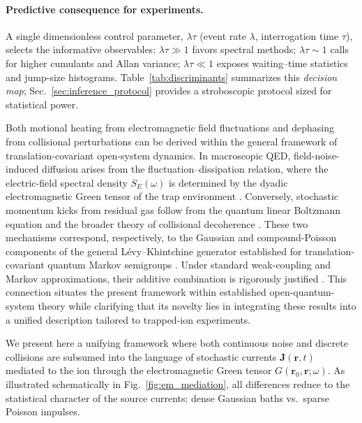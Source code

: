\paragraph{Predictive consequence for experiments.}
A single dimensionless control parameter, $\lambda\tau$ (event rate $\lambda$,
interrogation time $\tau$), selects the informative observables:
$\lambda\tau\gg1$ favors spectral methods; $\lambda\tau\sim1$ calls for higher
cumulants and Allan variance; $\lambda\tau\ll1$ exposes waiting--time statistics
and jump-size histograms. Table~\ref{tab:discriminants} summarizes this
\emph{decision map}; Sec.~\ref{sec:inference_protocol} provides a stroboscopic
protocol sized for statistical power.

Both motional heating from electromagnetic field fluctuations and
dephasing from collisional perturbations can be derived within the general
framework of translation-covariant open-system dynamics.
In macroscopic QED, field-noise-induced diffusion arises from the
fluctuation--dissipation relation, where the electric-field spectral
density $S_E(\omega)$ is determined by the dyadic electromagnetic Green
tensor of the trap environment
\cite{ScheelBuhmann2008,BrownnuttRMP2015,BuhmannDispersionForcesII}.
Conversely, stochastic momentum kicks from residual gas follow from the
quantum linear Boltzmann equation and the broader theory of collisional
decoherence
\cite{HornbergerSipe2003,VacchiniHornberger2009,OghittuNJPhys2023}.
These two mechanisms correspond, respectively, to the Gaussian and
compound-Poisson components of the general
L\'evy--Khintchine generator established for
translation-covariant quantum Markov semigroups
\cite{Holevo1993,VacchiniJMathPhys2001}.
Under standard weak-coupling and Markov approximations, their additive
combination is rigorously justified
\cite{BreuerPetruccione2002}.
This connection situates the present framework within established
open-quantum-system theory while clarifying that its novelty lies in
integrating these results into a unified description tailored to
trapped-ion experiments.

We present here a unifying framework where both continuous noise and discrete collisions are subsumed into the language of stochastic currents $\mathbf{J}(\mathbf{r},t)$ mediated to the ion through the electromagnetic Green tensor $G(\mathbf{r}_0,\mathbf{r};\omega)$.
As illustrated schematically in Fig.~\ref{fig:em_mediation}, all differences reduce to the statistical character of the source currents: dense Gaussian baths vs.~sparse Poisson impulses.

